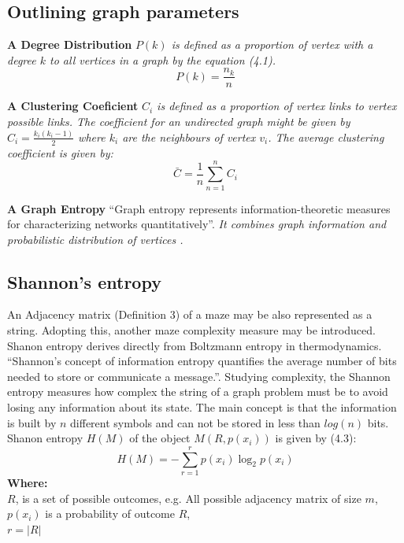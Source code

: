 \subsection{Outlining graph parameters}
\begin{definition}\textbf{A Degree Distribution} \emph{$P(k)$ is defined as a proportion of vertex with a degree $k$ to all vertices in a graph by the equation (4.1).}
\begin{equation}
P(k) = \frac{n_k}{n}
\end{equation}
\end{definition}
\begin{definition}\textbf{A Clustering Coeficient} \emph{$C_i$ is defined as a proportion of vertex links to vertex possible links. The coefficient for an undirected graph might be given by $C_i = \frac{k_i(k_i-1)}{2}$ where $k_i$ are the neighbours of vertex $v_i$. The average clustering coefficient is given by:}
\begin{equation}
\bar{C} = \frac{1}{n}\sum_{n = 1}^{n} C_i
\end{equation}
\end{definition}
\begin{definition}\textbf{A Graph Entropy} “Graph entropy represents information-theoretic measures for characterizing networks quantitatively”\cite{12}.
\emph{It combines graph information and probabilistic distribution of vertices \cite{13}.}\end{definition}
\subsection{Shannon's entropy}
An Adjacency matrix (Definition 3) of a maze may be also represented as a string. Adopting this, another maze complexity measure may be introduced.
Shanon entropy derives directly from Boltzmann entropy in thermodynamics. “Shannon’s concept of information entropy quantifies the average number of bits needed to store or communicate a message.”\cite{11}. Studying complexity, the Shannon entropy measures how complex the string of a graph problem must be to avoid losing any information about its state. The main concept is that the information is built by $n$ different symbols and can not be stored in less than $log(n)$ bits.
Shanon entropy $H(M)$ of the object $M(R, p(x_i))$ is given by (4.3)\cite{11}:
\begin{equation}
H(M) = - \sum_{r = 1}^{r} p(x_i)\log_2 p(x_i)
\end{equation}
\textbf{Where:}\\
$R$, is a set of possible outcomes, e.g.  All possible adjacency matrix of size $m$,\\
$p(x_i)$ is a probability of outcome $R$,\\
$r= |R|$\\
